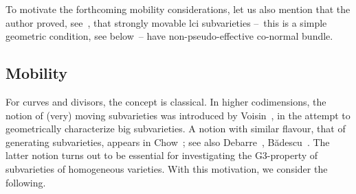 \documentclass[10pt,a4paper]{article}
\numberwithin{equation}{section}
\theoremstyle{definition}
\theoremstyle{remark}
\begin{document}
To motivate the forthcoming mobility considerations, let us also mention that the author proved, see~\cite[Proposition 3.5]{hlc-g2}, that strongly movable lci subvarieties --~this is a simple geometric condition, see below~-- have non-pseudo-effective co-normal bundle. 


\subsection{Mobility}

For curves and divisors, the concept is classical. In higher codimensions, the notion of (very) moving subvarieties was introduced by Voisin~\cite{voisin-coniv}, in the attempt to geometrically characterize big subvarieties. A notion with similar flavour, that of generating subvarieties, appears in Chow~\cite{chow}; see also Debarre~\cite{dbar-mumford}, B\u{a}descu~\cite{bad}. The latter notion turns out to be essential for investigating the G3-property of subvarieties of homogeneous varieties. With this motivation, we consider the following. 
\end{document}
